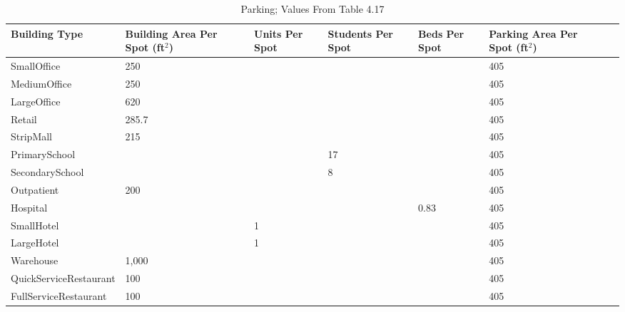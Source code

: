 \begin{table}
\small
\centering
\caption[Parking]{Parking; Values From \cite{osti_1015277} Table 4.17}
\label{tab:parking}
\begin{tabular}{|l|p{0.75in}|p{0.5in}|p{0.5in}|p{0.5in}|p{0.75in}|p{1.5in}|}
\hline
\textbf{Building Type} & \textbf{Building Area Per Spot (ft$^2$)} & \textbf{Units Per Spot} & \textbf{Students Per Spot} & \textbf{Beds Per Spot} & \textbf{Parking Area Per Spot (ft$^2$)} \\ \hline
SmallOffice & 250 & & & & 405 \\ \hline
MediumOffice & 250 & & & & 405  \\ \hline
LargeOffice & 620 & & & & 405  \\ \hline
Retail & 285.7 & & & & 405  \\ \hline
StripMall & 215 & & & & 405  \\ \hline
PrimarySchool & & & 17 & & 405 \\ \hline
SecondarySchool & & & 8 & & 405 \\ \hline
Outpatient & 200 & & & & 405 \\ \hline
Hospital & & & & 0.83 & 405 \\ \hline
SmallHotel & & 1 & & & 405 \\ \hline
LargeHotel & & 1 & & & 405 \\ \hline
Warehouse & 1,000 & & & & 405 \\ \hline
QuickServiceRestaurant & 100 & & & & 405 \\ \hline
FullServiceRestaurant & 100 & & & & 405 \\ \hline
\end{tabular}
\end{table}